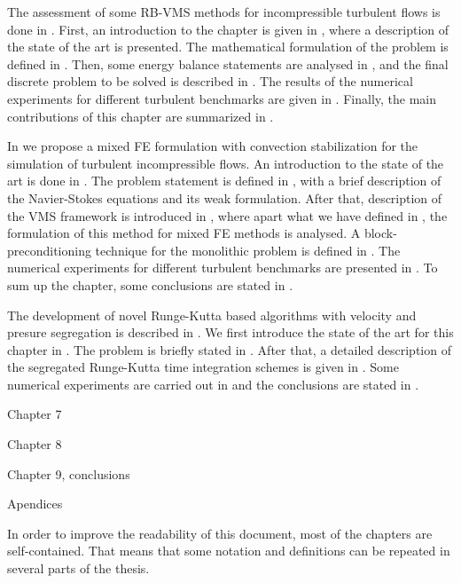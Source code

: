The assessment of some RB-VMS methods for incompressible turbulent flows is done in . First, an introduction to the chapter is given in , where a description of the state of the art is presented. The mathematical formulation of the problem is defined in . Then, some energy balance statements are analysed in , and the final discrete problem to be solved is described in . The results of the numerical experiments for different turbulent benchmarks are given in . Finally, the main contributions of this chapter are summarized in .

In  we propose a mixed FE formulation with convection stabilization for the simulation of turbulent incompressible flows. An introduction to the state of the art is done in . The problem statement is defined in , with a brief description of the Navier-Stokes equations and its weak formulation. After that, description of the VMS framework is introduced in , where apart what we have defined in , the formulation of this method for mixed FE methods is analysed. A block-preconditioning technique for the monolithic problem is defined in . The numerical experiments for different turbulent benchmarks are presented in . To sum up the chapter, some conclusions are stated in .

The development of novel Runge-Kutta based algorithms with velocity and presure segregation is described in . We first introduce the state of the art for this chapter in . The problem is briefly stated in . After that, a detailed description of the segregated Runge-Kutta time integration schemes is given in . Some numerical experiments are carried out in  and the conclusions are stated in .

Chapter 7

Chapter 8

Chapter 9, conclusions

Apendices

In order to improve the readability of this document, most of the chapters are self-contained. That means that some notation and definitions can be repeated in several parts of the thesis.